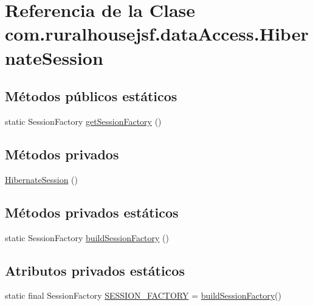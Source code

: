 \hypertarget{classcom_1_1ruralhousejsf_1_1data_access_1_1_hibernate_session}{}\section{Referencia de la Clase com.\+ruralhousejsf.\+data\+Access.\+Hibernate\+Session}
\label{classcom_1_1ruralhousejsf_1_1data_access_1_1_hibernate_session}
\subsection*{Métodos públicos estáticos}
\begin{DoxyCompactItemize}
\item 
static Session\+Factory \mbox{\hyperlink{classcom_1_1ruralhousejsf_1_1data_access_1_1_hibernate_session_ac3420369289a3eb4051f880815d4b5c1}{get\+Session\+Factory}} ()
\end{DoxyCompactItemize}
\subsection*{Métodos privados}
\begin{DoxyCompactItemize}
\item 
\mbox{\hyperlink{classcom_1_1ruralhousejsf_1_1data_access_1_1_hibernate_session_aaa61245491eaeb6fb6e4d5d4fb23273c}{Hibernate\+Session}} ()
\end{DoxyCompactItemize}
\subsection*{Métodos privados estáticos}
\begin{DoxyCompactItemize}
\item 
static Session\+Factory \mbox{\hyperlink{classcom_1_1ruralhousejsf_1_1data_access_1_1_hibernate_session_a54c628cf25032f8511a199671e73820d}{build\+Session\+Factory}} ()
\end{DoxyCompactItemize}
\subsection*{Atributos privados estáticos}
\begin{DoxyCompactItemize}
\item 
static final Session\+Factory \mbox{\hyperlink{classcom_1_1ruralhousejsf_1_1data_access_1_1_hibernate_session_abb795a9ae4989d1caa92621d53529fe1}{S\+E\+S\+S\+I\+O\+N\+\_\+\+F\+A\+C\+T\+O\+RY}} = \mbox{\hyperlink{classcom_1_1ruralhousejsf_1_1data_access_1_1_hibernate_session_a54c628cf25032f8511a199671e73820d}{build\+Session\+Factory}}()
\end{DoxyCompactItemize}



